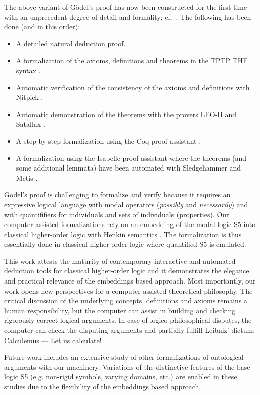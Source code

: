 \documentclass{llncs}
\begin{document}
The above variant of G\"{o}del's proof has now been 
constructed for the first-time
with an unprecedent degree of detail and formality; cf.~\cite{FormalTheologyRepository}. The following has been done (and in this order):
\begin{itemize}
\item A detailed natural deduction proof.
%
\item A formalization of the axioms, definitions and theorems in the TPTP THF syntax \cite{J22}.
%
\item Automatic verification of the consistency of the axioms and 
definitions with Nitpick \cite{Nitpick}.
%
\item Automatic demonstration of the theorems with the provers LEO-II \cite{LEO-II} and Satallax \cite{Satallax}.

\item A step-by-step formalization using the Coq proof assistant \cite{Coq}.

\item A formalization using the Isabelle proof assistant \cite{Isabelle} where the theorems (and some additional lemmata) have been automated with Sledgehammer \cite{Sledgehammer} and Metis \cite{Hurd03first-orderproof}.
\end{itemize}

G\"{o}del's proof is challenging to formalize and verify because it
requires an expressive logical language with modal operators
(\emph{possibly} and \emph{necessarily}) and with
quantififiers for individuals and sets of individuals (properties).  Our computer-assisted formalizations rely on an
embedding of the modal logic S5 into classical higher-order logic with
Henkin semantics \cite{J23,B9}. The formalization is thus essentially
done in classical higher-order logic where quantified S5 is emulated.

This work attests the maturity of contemporary interactive and
automated deduction tools for classical higher-order logic and it
demonstrates the elegance and practical relevance of the embeddings
based approach.  Most importantly, our work opens new perspectives for
a computer-assisted theoretical philosophy.  The critical discussion
of the underlying concepts, definitions and axioms remains a human
responsibility, but the computer can assist in building and checking
rigorously correct logical arguments. In case of logico-philosophical
disputes, the computer can check the disputing arguments and partially
fulfill Leibniz' dictum: Calculemus --- Let us calculate!

Future work includes an extensive study of other formalizations of
ontological arguments with our machinery. Variations of the
distinctive features of the base logic S5 (e.g. non-rigid symbols, 
varying domains, etc.) are enabled in these studies due
to the flexibility of the embeddings based approach.



\end{document}
